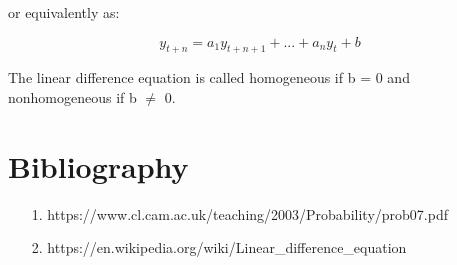 \documentclass{article}
\begin{document}
    or equivalently as:
    
    \[y_{t+n} = a_1 y_{t+n+1} + ... + a_n y_t + b\]
    
    The linear difference equation is called homogeneous if b = 0 and nonhomogeneous if b \(\ne\) 0.
    
\section{Bibliography}

    \begin{itemize}
        \item[1.]  https://www.cl.cam.ac.uk/teaching/2003/Probability/prob07.pdf
        \item[2.] https://en.wikipedia.org/wiki/Linear\_difference\_equation
    \end{itemize}
\end{document}
